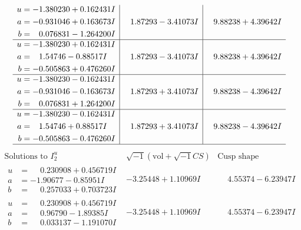 \documentclass[1p]{elsarticle_modified}
\theoremstyle{definition}
\newcommand{\I}{\sqrt{-1}}
\begin{document}
$$\begin{array}{c|c|c}
\begin{aligned}
u &= -1.380230 + 0.162431 I \\
a &= -0.931046 + 0.163673 I \\
b &= \phantom{-}0.076831 - 1.264200 I\end{aligned}
 & \phantom{-}1.87293 - 3.41073 I & \phantom{-}9.88238 + 4.39642 I \\ \hline\begin{aligned}
u &= -1.380230 + 0.162431 I \\
a &= \phantom{-}1.54746 - 0.88517 I \\
b &= -0.505863 + 0.476260 I\end{aligned}
 & \phantom{-}1.87293 - 3.41073 I & \phantom{-}9.88238 + 4.39642 I \\ \hline\begin{aligned}
u &= -1.380230 - 0.162431 I \\
a &= -0.931046 - 0.163673 I \\
b &= \phantom{-}0.076831 + 1.264200 I\end{aligned}
 & \phantom{-}1.87293 + 3.41073 I & \phantom{-}9.88238 - 4.39642 I \\ \hline\begin{aligned}
u &= -1.380230 - 0.162431 I \\
a &= \phantom{-}1.54746 + 0.88517 I \\
b &= -0.505863 - 0.476260 I\end{aligned}
 & \phantom{-}1.87293 + 3.41073 I & \phantom{-}9.88238 - 4.39642 I\\
 \hline 
 \end{array}$$\newpage$$\begin{array}{c|c|c}  
\text{Solutions to }I^u_{2}& \I (\text{vol} + \sqrt{-1}CS) & \text{Cusp shape}\\
 \hline 
\begin{aligned}
u &= \phantom{-}0.230908 + 0.456719 I \\
a &= -1.90677 - 0.85951 I \\
b &= \phantom{-}0.257033 + 0.703723 I\end{aligned}
 & -3.25448 + 1.10969 I & \phantom{-}4.55374 - 6.23947 I \\ \hline\begin{aligned}
u &= \phantom{-}0.230908 + 0.456719 I \\
a &= \phantom{-}0.96790 - 1.89385 I \\
b &= \phantom{-}0.033137 - 1.191070 I\end{aligned}
 & -3.25448 + 1.10969 I & \phantom{-}4.55374 - 6.23947 I \\ \hline\begin{aligned}

\end{aligned}
\end{array}$$
\end{document}
